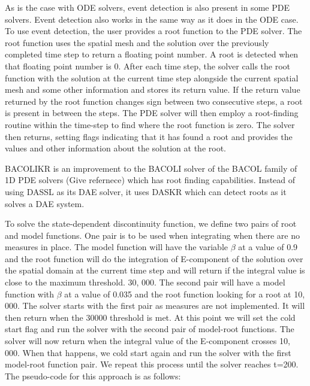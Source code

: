 \documentclass{article}
\begin{document}
As is the case with ODE solvers, event detection is also present in some PDE solvers. Event detection also works in the same way as it does in the ODE case. To use event detection, the user provides a root function to the PDE solver. The root function uses the spatial mesh and the solution over the previously completed time step to return a floating point number. A root is detected when that floating point number is 0. After each time step, the solver calls the root function with the solution at the current time step alongside the current spatial mesh and some other information and stores its return value. If the return value returned by the root function changes sign between two consecutive steps, a root is present in between the steps. The PDE solver will then employ a root-finding routine within the time-step to find where the root function is zero. The solver then returns, setting flags indicating that it has found a root and provides the values and other information about the solution at the root.
 
BACOLIKR is an improvement to the BACOLI solver of the BACOL family of 1D PDE solvers (Give refernece) which has root finding capabilities. Instead of using DASSL as its DAE solver, it uses DASKR which can detect roots as it solves a DAE system.   

To solve the state-dependent discontinuity function, we define two pairs of root and model functions. One pair is to be used when integrating when there are no measures in place. The model function will have the variable $\beta$ at a value of 0.9 and the root function will do the integration of E-component of the solution over the spatial domain at the current time step and will return if the integral value is close to the maximum threshold. 30, 000. The second pair will have a model function with $\beta$ at a value of 0.035 and the root function looking for a root at 10, 000. The solver starts with the first pair as measures are not implemented. It will then return when the 30000 threshold is met. At this point we will set the cold start flag and run the solver with the second pair of model-root functions. The solver will now return when the integral value of the E-component crosses 10, 000. When that happens, we cold start again and run the solver with the first model-root function pair. We repeat this process until the solver reaches t=200. The pseudo-code for this approach is as follows:
\end{document}
